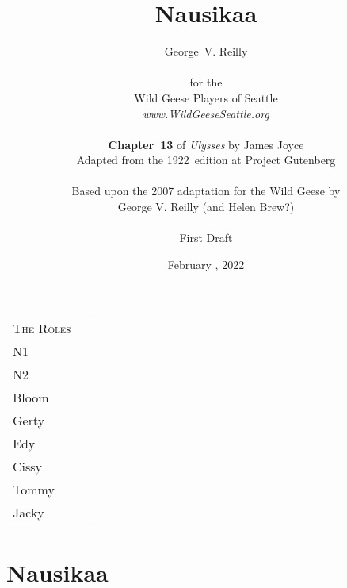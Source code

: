 


\title{\Huge Nausikaa}
\author{George~V. Reilly\\
\\
{\small for the}\\
Wild Geese Players of Seattle\\
{\textit{www.WildGeeseSeattle.org}}\\
\\
{\small \textbf{Chapter~13} of \textit{Ulysses} by James Joyce}\\
{\small Adapted from the 1922~edition at Project Gutenberg}
\\
\\
{\small Based upon the 2007 adaptation for the Wild Geese by}\\
{\small George V. Reilly
(and Helen Brew?)
}\\
\\
{\small First Draft}}
\date{February , 2022}
\raggedbottom



\maketitle
\thispagestyle{empty}
\pagebreak

\begin{tabular}{lp{10cm}}
    \multicolumn{1}{c}{\Large \textsc{The Roles}} \\
N1 \\
N2 \\
Bloom \\
Gerty \\
Edy \\
Cissy \\
Tommy \\
Jacky \\
\end{tabular}

\thispagestyle{empty}
\newpage


\setcounter{page}{1}

\section*{Nausikaa}




